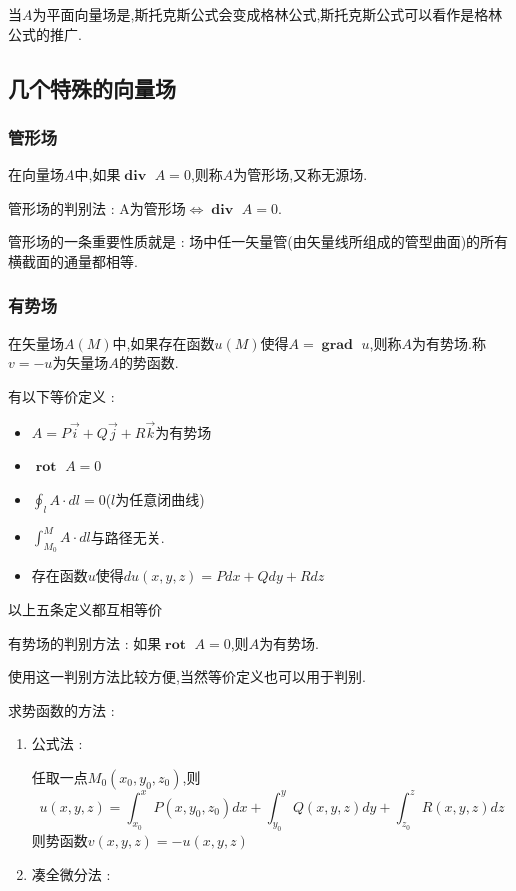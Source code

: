 \documentclass[UTF8,12pt]{ctexbook}
\newcommand{\definiteIntegral}[2]{\int^{#1}_{#2}}
\newcommand{\spaceline}{\\\indent}
\newcommand{\curveIntegralOnLine}[1]{\oint_{#1}}
\DeclareMathOperator{\divergenceText}{\mathbf{div}\ }
\DeclareMathOperator{\curlRotText}{\mathbf{rot}\ }
\DeclareMathOperator{\gradText}{\mathbf{grad}\ }
\begin{document}
{{{{{      当$A$为平面向量场是,斯托克斯公式会变成格林公式,斯托克斯公式可以看作是格林公式的推广.
    }%

  }%

  \subsection{几个特殊的向量场}{

    \subsubsection{管形场}{
      在向量场$A$中,如果$\divergenceText A = 0$,则称$A$为管形场,又称无源场.

      管形场的判别法 : A为管形场$\Leftrightarrow \divergenceText A = 0$.

      管形场的一条重要性质就是 : 场中任一矢量管(由矢量线所组成的管型曲面)的所有横截面的通量都相等.
    }%

    \subsubsection{有势场}{
      在矢量场$A(M)$中,如果存在函数$u(M)$使得$A = \gradText u$,则称$A$为有势场.称$v = -u$为矢量场$A$的势函数.

      有以下等价定义 :
      \begin{itemize}
        \item $A = P\vec{i} + Q\vec{j} + R\vec{k}$为有势场
        \item $\curlRotText A = 0$
        \item $\curveIntegralOnLine{l} A \cdot dl = 0$($l$为任意闭曲线)
        \item $\definiteIntegral{M}{M_0}A \cdot dl$与路径无关.
        \item 存在函数$u$使得$du(x,y,z) = Pdx + Qdy + Rdz$
      \end{itemize}
      以上五条定义都互相等价

      有势场的判别方法 : 如果$\curlRotText A = 0$,则$A$为有势场.

      使用这一判别方法比较方便,当然等价定义也可以用于判别.\spaceline

      求势函数的方法 :
      \begin{enumerate}
        \item {
              公式法 :

              任取一点$M_0(x_0,y_0,z_0)$,则$$
                u(x,y,z) = \definiteIntegral{x}{x_0}P(x,y_0,z_0)dx + \definiteIntegral{y}{y_0}Q(x,y,z)dy + \definiteIntegral{z}{z_0}R(x,y,z)dz %
              $$
              则势函数$v(x,y,z) = -u(x,y,z)$
              }
        \item {
              凑全微分法 :

}
\end{enumerate}}}}}}
\end{document}
